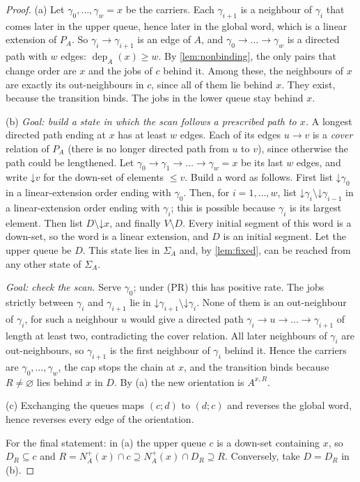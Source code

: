 \documentclass[11pt,a4paper]{article}
\theoremstyle{plain}
\theoremstyle{plain}
\newcommand{\dep}{\operatorname{dep}}
\newcommand{\Nout}{N^{+}}
\newcommand{\Sg}{\Sigma}
\newcommand{\empt}{\varnothing}
\begin{document}
\begin{proof}
(a) Let $\gamma_0,\dots,\gamma_w=x$ be the carriers. Each $\gamma_{i+1}$ is a neighbour of $\gamma_i$ that comes later in the upper queue, hence later in the global word, which is a linear extension of $P_A$. So $\gamma_i\to \gamma_{i+1}$ is an edge of $A$, and $\gamma_0\to\dots\to \gamma_w$ is a directed path with $w$ edges: $\dep_A(x)\ge w$. By \cref{lem:nonbinding}, the only pairs that change order are $x$ and the jobs of $c$ behind it. Among these, the neighbours of $x$ are exactly its out-neighbours in $c$, since all of them lie behind $x$. They exist, because the transition binds. The jobs in the lower queue stay behind $x$.

(b) \emph{Goal: build a state in which the scan follows a prescribed path to $x$.} A longest directed path ending at $x$ has at least $w$ edges. Each of its edges $u\to v$ is a \emph{cover} relation of $P_A$ (there is no longer directed path from $u$ to $v$), since otherwise the path could be lengthened. Let $\gamma_0\to \gamma_1\to\dots\to \gamma_w=x$ be its last $w$ edges, and write $\mathord{\downarrow}v$ for the down-set of elements $\le v$. Build a word as follows. First list $\mathord{\downarrow}\gamma_0$ in a linear-extension order ending with $\gamma_0$. Then, for $i=1,\dots,w$, list $\mathord{\downarrow}\gamma_i\setminus\mathord{\downarrow}\gamma_{i-1}$ in a linear-extension order ending with $\gamma_i$; this is possible because $\gamma_i$ is its largest element. Then list $D\setminus\mathord{\downarrow}x$, and finally $V\setminus D$. Every initial segment of this word is a down-set, so the word is a linear extension, and $D$ is an initial segment. Let the upper queue be $D$. This state lies in $\Sg_A$ and, by \cref{lem:fixed}, can be reached from any other state of $\Sg_A$.

\emph{Goal: check the scan.} Serve $\gamma_0$; under (PR) this has positive rate. The jobs strictly between $\gamma_i$ and $\gamma_{i+1}$ lie in $\mathord{\downarrow}\gamma_{i+1}\setminus\mathord{\downarrow}\gamma_i$. None of them is an out-neighbour of $\gamma_i$, for such a neighbour $u$ would give a directed path $\gamma_i\to u\to\dots\to \gamma_{i+1}$ of length at least two, contradicting the cover relation. All later neighbours of $\gamma_i$ are out-neighbours, so $\gamma_{i+1}$ is the first neighbour of $\gamma_i$ behind it. Hence the carriers are $\gamma_0,\dots,\gamma_w$, the cap stops the chain at $x$, and the transition binds because $R\neq\empt$ lies behind $x$ in $D$. By (a) the new orientation is $A^{x,R}$.

(c) Exchanging the queues maps $(c;d)$ to $(d;c)$ and reverses the global word, hence reverses every edge of the orientation.

For the final statement: in (a) the upper queue $c$ is a down-set containing $x$, so $D_R\subseteq c$ and $R=\Nout_A(x)\cap c\supseteq\Nout_A(x)\cap D_R\supseteq R$. Conversely, take $D=D_R$ in (b).
\end{proof}
\end{document}
